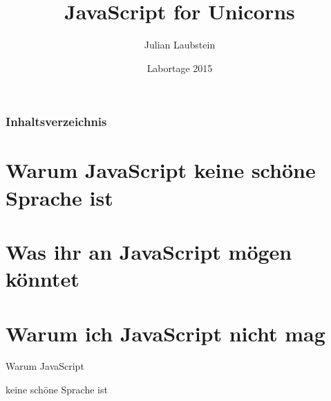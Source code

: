 \documentclass{beamer}
\title[Short title]{JavaScript for Unicorns} %
\author{Julian Laubstein} %
\institute[UCLA] %
{
\medskip
\textit{julianlaubstein@yahoo.de} %
}
\date{Labortage 2015} %
\begin{document}
\begin{frame}
\titlepage %
\end{frame}

\begin{frame}
\frametitle{Inhaltsverzeichnis} %
\tableofcontents %
\end{frame}


\section{Warum JavaScript keine schöne Sprache ist} %

\section{Was ihr an JavaScript mögen könntet} %

\section{Warum ich JavaScript nicht mag}

\begin{frame}
\Huge{
\centerline{Warum JavaScript}
\centerline{keine schöne Sprache ist}
}
\end{frame}

\end{document}
